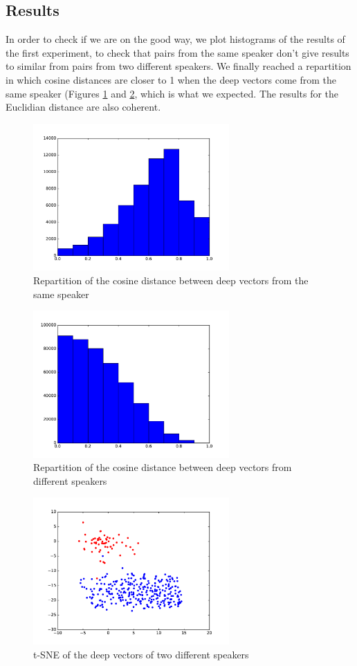 \documentclass[conference]{IEEEtran}
\begin{document}
\subsection{Results}

In order to check if we are on the good way, we plot histograms of the results of the first experiment, to check that pairs from the same speaker don't give results to similar from pairs from two different speakers. We finally reached a repartition in which cosine distances are closer to 1 when the deep vectors come from the same speaker (Figures \ref{cos_same} and \ref{cos_diff}, which is what we expected. The results for the Euclidian distance are also coherent.

\begin{figure}[!h]
    \centering
    \includegraphics[width=7.5cm]{../secondNet/cosine_same.pdf}
    \caption{Repartition of the cosine distance between deep vectors from the same speaker}
    \label{cos_same}
\end{figure}
\begin{figure}[!h]
    \centering
    \includegraphics[width=7.5cm]{../secondNet/cosine_diff.pdf}
    \caption{Repartition of the cosine distance between deep vectors from different speakers}
	\label{cos_diff}
\end{figure}

\begin{figure}[!h]
    \centering
    \includegraphics[width=7.5cm]{../secondNet/tSNE_HOUDIN_TRUCHOT.pdf}
    \caption{t-SNE of the deep vectors of two different speakers}
	\label{tSNE}
\end{figure}
\end{document}
